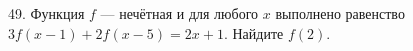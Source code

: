 49. Функция $f$ --- нечётная и для любого $x$ выполнено равенство $3f(x-1)+2f(x-5)=2x+1.$ Найдите $f(2).$\\
